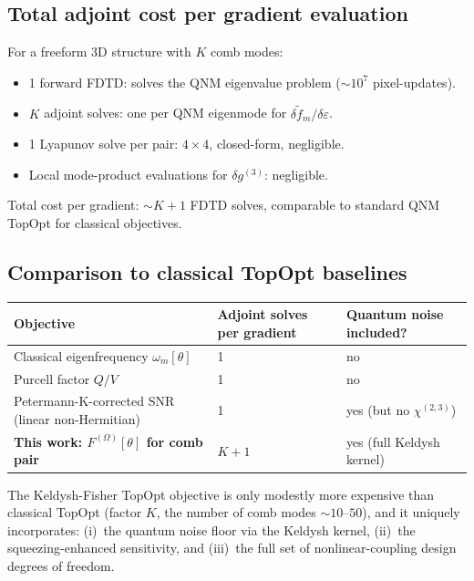 \documentclass[11pt]{article}
\begin{document}
\subsection{Total adjoint cost per gradient evaluation}

For a freeform 3D structure with $K$ comb modes:
\begin{itemize}\itemsep0em
  \item 1 forward FDTD: solves the QNM eigenvalue problem
    ($\sim 10^7$ pixel-updates).
  \item $K$ adjoint solves: one per QNM eigenmode for
    $\delta\tilde f_m/\delta\varepsilon$.
  \item 1 Lyapunov solve per pair: $4\times 4$, closed-form, negligible.
  \item Local mode-product evaluations for $\delta g^{(3)}$: negligible.
\end{itemize}
Total cost per gradient: $\sim K+1$ FDTD solves, comparable to standard
QNM TopOpt for classical objectives.

\subsection{Comparison to classical TopOpt baselines}

\begin{center}\small
\begin{tabular}{lll}
\toprule
Objective & Adjoint solves per gradient & Quantum noise included? \\
\midrule
Classical eigenfrequency $\omega_m[\theta]$ & 1 & no \\
Purcell factor $Q/V$ & 1 & no \\
Petermann-K-corrected SNR (linear non-Hermitian) & 1 & yes (but no $\chi^{(2,3)}$) \\
\textbf{This work: $F^{(\Omega)}[\theta]$ for comb pair} & $K+1$ & yes (full Keldysh kernel) \\
\bottomrule
\end{tabular}
\end{center}

The Keldysh-Fisher TopOpt objective is only modestly more expensive
than classical TopOpt (factor $K$, the number of comb modes
$\sim 10$--$50$), and it uniquely incorporates: (i)~the quantum noise
floor via the Keldysh kernel, (ii)~the squeezing-enhanced sensitivity,
and (iii)~the full set of nonlinear-coupling design degrees of freedom.

\end{document}
